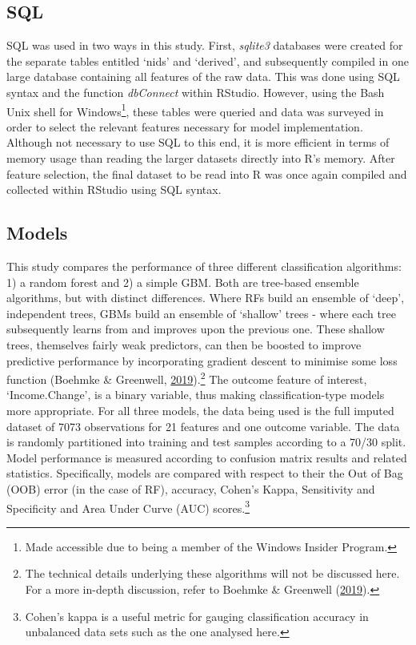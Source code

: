 \documentclass[11pt,preprint, authoryear]{elsarticle}
\numberwithin{equation}{section}
\numberwithin{figure}{section}
\numberwithin{table}{section}
\let\rmarkdownfootnote\footnote%
\def\footnote{\protect\rmarkdownfootnote}
\begin{document}
\hypertarget{sql}{%
\subsection*{SQL}\label{sql}}

SQL was used in two ways in this study. First, \emph{sqlite3} databases
were created for the separate tables entitled `nids' and `derived', and
subsequently compiled in one large database containing all features of
the raw data. This was done using SQL syntax and the function
\emph{dbConnect} within RStudio. However, using the Bash Unix shell for
Windows\footnote{Made accessible due to being a member of the Windows
  Insider Program.}, these tables were queried and data was surveyed in
order to select the relevant features necessary for model
implementation. Although not necessary to use SQL to this end, it is
more efficient in terms of memory usage than reading the larger datasets
directly into R's memory. After feature selection, the final dataset to
be read into R was once again compiled and collected within RStudio
using SQL syntax.

\hypertarget{models}{%
\subsection*{Models}\label{models}}

This study compares the performance of three different classification
algorithms: 1) a random forest and 2) a simple GBM. Both are tree-based
ensemble algorithms, but with distinct differences. Where RFs build an
ensemble of `deep', independent trees, GBMs build an ensemble of
`shallow' trees - where each tree subsequently learns from and improves
upon the previous one. These shallow trees, themselves fairly weak
predictors, can then be boosted to improve predictive performance by
incorporating gradient descent to minimise some loss function (Boehmke
\& Greenwell, \protect\hyperlink{ref-boehmke}{2019}).\footnote{The
  technical details underlying these algorithms will not be discussed
  here. For a more in-depth discussion, refer to Boehmke \& Greenwell
  (\protect\hyperlink{ref-boehmke}{2019}).} The outcome feature of
interest, `Income.Change', is a binary variable, thus making
classification-type models more appropriate. For all three models, the
data being used is the full imputed dataset of 7073 observations for 21
features and one outcome variable. The data is randomly partitioned into
training and test samples according to a 70/30 split. Model performance
is measured according to confusion matrix results and related
statistics. Specifically, models are compared with respect to their the
Out of Bag (OOB) error (in the case of RF), accuracy, Cohen's Kappa,
Sensitivity and Specificity and Area Under Curve (AUC) scores.\footnote{Cohen's
  kappa is a useful metric for gauging classification accuracy in
  unbalanced data sets such as the one analysed here.}
\end{document}
